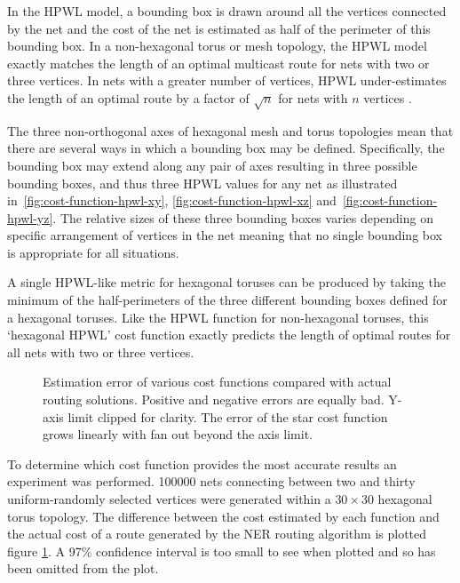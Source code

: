 				In the HPWL model, a bounding box is drawn around all the vertices
				connected by the net and the cost of the net is estimated as half of
				the perimeter of this bounding box. In a non-hexagonal torus or mesh
				topology, the HPWL model exactly matches the length of an optimal
				multicast route for nets with two or three vertices. In nets with a
				greater number of vertices, HPWL under-estimates the length of an
				optimal route by a factor of $\sqrt{n}$ for nets with $n$ vertices
				\cite{chung79}.
				
				The three non-orthogonal axes of hexagonal mesh and torus topologies mean
				that there are several ways in which a bounding box may be defined.
				Specifically, the bounding box may extend along any pair of axes
				resulting in three possible bounding boxes, and thus three HPWL values
				for any net as illustrated in~\ref{fig:cost-function-hpwl-xy},
				\ref{fig:cost-function-hpwl-xz} and~\ref{fig:cost-function-hpwl-yz}. The
				relative sizes of these three bounding boxes varies depending on specific
				arrangement of vertices in the net meaning that no single bounding box is
				appropriate for all situations.
				
				A single HPWL-like metric for hexagonal toruses can be produced by
				taking the minimum of the half-perimeters of the three different
				bounding boxes defined for a hexagonal toruses. Like the HPWL function
				for non-hexagonal toruses, this `hexagonal HPWL' cost function exactly
				predicts the length of optimal routes for all nets with two or three
				vertices.
				
				\begin{figure}
					\center
					
					\caption{Estimation error of various cost functions compared with
					actual routing solutions. Positive and negative errors are equally
					bad. Y-axis limit clipped for clarity. The error of the star cost
					function grows linearly with fan out beyond the axis limit.}
					\label{fig:cost-function-error}
				\end{figure}
				
				To determine which cost function provides the most accurate results an
				experiment was performed. \num{100000} nets connecting between two and
				thirty uniform-randomly selected vertices were generated within a
				$30\times30$ hexagonal torus topology. The difference between the cost
				estimated by each function and the actual cost of a route generated by
				the NER routing algorithm is plotted figure
				\ref{fig:cost-function-error}. A 97\% confidence interval is too small
				to see when plotted and so has been omitted from the plot.
				
